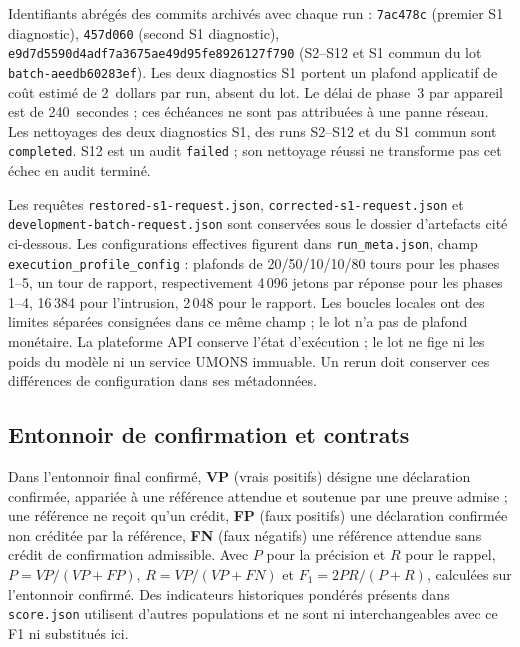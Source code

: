 \documentclass[11pt,a4paper]{article}
\newcommand{\code}[1]{{\urlstyle{tt}\nolinkurl{#1}}}
\begin{document}
Identifiants abr\'eg\'es des commits archiv\'es avec chaque run : \code{7ac478c} (premier S1 diagnostic), \code{457d060} (second S1 diagnostic), \code{e9d7d5590d4adf7a3675ae49d95fe8926127f790} (S2--S12 et S1 commun du lot \code{batch-aeedb60283ef}). Les deux diagnostics S1 portent un plafond applicatif de co\^ut estim\'e de 2~dollars par run, absent du lot. Le d\'elai de phase~3 par appareil est de 240~secondes ; ces \'ech\'eances ne sont pas attribu\'ees \`a une panne r\'eseau. Les nettoyages des deux diagnostics S1, des runs S2--S12 et du S1 commun sont \code{completed}. S12 est un audit \code{failed} ; son nettoyage r\'eussi ne transforme pas cet \'echec en audit termin\'e.

Les requêtes \code{restored-s1-request.json}, \code{corrected-s1-request.json} et \code{development-batch-request.json} sont conservées sous le dossier d'artefacts cité ci-dessous. Les configurations effectives figurent dans \code{run_meta.json}, champ \code{execution_profile_config} : plafonds de 20/50/10/10/80 tours pour les phases 1--5, un tour de rapport, respectivement 4\,096 jetons par réponse pour les phases 1--4, 16\,384 pour l'intrusion, 2\,048 pour le rapport. Les boucles locales ont des limites séparées consignées dans ce même champ ; le lot n'a pas de plafond monétaire. La plateforme API conserve l'\'etat d'ex\'ecution ; le lot ne fige ni les poids du mod\`ele ni un service UMONS immuable. Un rerun doit conserver ces diff\'erences de configuration dans ses m\'etadonn\'ees.

\subsection{Entonnoir de confirmation et contrats}
Dans l'entonnoir final confirm\'e, \textbf{VP} (vrais positifs) désigne une déclaration confirmée, appariée à une référence attendue et soutenue par une preuve admise ; une référence ne reçoit qu'un crédit, \textbf{FP} (faux positifs) une d\'eclaration confirm\'ee non cr\'edit\'ee par la r\'ef\'erence, \textbf{FN} (faux n\'egatifs) une référence attendue sans crédit de confirmation admissible. Avec \(P\) pour la pr\'ecision et \(R\) pour le rappel, \(P=VP/(VP+FP)\), \(R=VP/(VP+FN)\) et \(F_1=2PR/(P+R)\), calcul\'ees sur l'entonnoir confirm\'e. Des indicateurs historiques pond\'er\'es pr\'esents dans \code{score.json} utilisent d'autres populations et ne sont ni interchangeables avec ce F1 ni substitu\'es ici.
\end{document}
